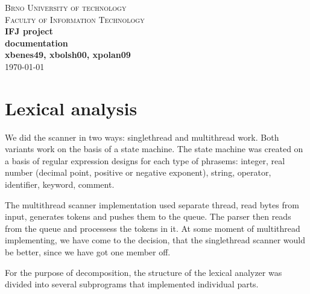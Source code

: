 \documentclass[10pt,a4paper,titlepage]{article}
\begin{document}
\begin{titlepage}

\begin{center}
\textsc{\LARGE Brno University of technology}\\[0.5cm]
\textsc{\large Faculty of Information Technology}\\[7cm]

{ \huge \bfseries IFJ project}\\[0.3cm]
{ \Large \bfseries documentation}\\[0.4cm]
{\bfseries xbenes49, xbolsh00, xpolan09}\\[10cm]

\today
\end{center}

\end{titlepage}
\newpage


\setcounter{page}{1}

\section{Lexical analysis}

\begin{justify}
We did the scanner in two ways: singlethread and multithread work. Both variants work on the basis of a state machine.
The state machine was created on a basis of regular expression designs for each type of phrasems:
integer, real number (decimal point, positive or negative exponent), string, operator, identifier, keyword, comment.

The multithread scanner implementation used separate thread, read bytes from input, generates tokens and pushes
them to the queue. The parser then reads from the queue and processess the tokens in it. At some moment of multithread
implementing, we have come to the decision, that the singlethread scanner would be better, since we have got one member off.

For the purpose of decomposition, the structure of the lexical analyzer was divided into several subprograms
that implemented individual parts.
\end{justify}
\end{document}
